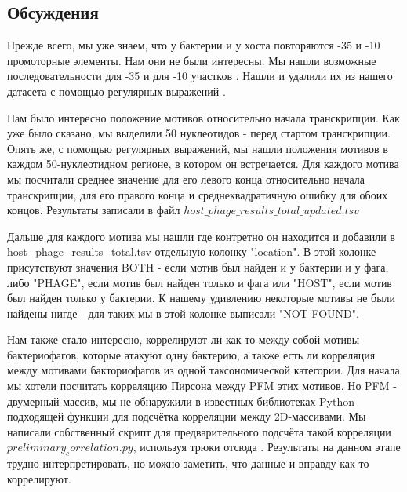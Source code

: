 \documentclass[a4paper,12pt]{article}
\begin{document}
\begin{center}
\item \subsection{Обсуждения}
\end{center}

    \par{Прежде всего, мы уже знаем, что у бактерии и у хоста повторяются -35 и -10 промоторные элементы. Нам они не
    были интересны. Мы нашли возможные последовательности для -35 и для -10 участков \cite{-35,-10,-35-10,-35-10wiki}.
    Нашли и удалили их из нашего датасета с помощью регулярных выражений \cite{re}. }
    
    \par{Нам было интересно положение мотивов относительно начала транскрипции. Как уже было сказано, мы выделили 50 
    нуклеотидов - перед стартом транскрипции. Опять же, с помощью регулярных выражений, мы нашли положения мотивов в
    каждом 50-нуклеотидном регионе, в котором он встречается. Для каждого мотива мы посчитали среднее значение для его
    левого конца относительно начала транскрипции, для его правого конца и среднеквадратичную ошибку для обоих
    концов. Результаты записали в файл $ host\_phage\_results\_total\_updated.tsv $}
    
    \par{Дальше для каждого мотива мы нашли где контретно он находится и добавили в host\_phage\_results\_total.tsv
    отдельную колонку "location". В этой колонке присутствуют значения BOTH - если мотив был найден и у бактерии и у
    фага, либо "PHAGE", если мотив был найден только и фага или "HOST", если мотив был найден только у бактерии. К
    нашему удивлению некоторые мотивы не были найдены нигде - для таких мы в этой колонке выписали "NOT FOUND".}
    
    \par{Нам также стало интересно, коррелируют ли как-то между собой мотивы бактериофагов, которые атакуют одну бактерию, а также есть ли корреляция между мотивами бакториофагов из одной таксономической категории. Для начала мы хотели посчитать корреляцию Пирсона между PFM этих мотивов. Но PFM - двумерный массив, мы не обнаружили в известных библиотеках Python подходящей функции для подсчётка корреляции между 2D-массивами. Мы написали собственный скрипт для предварительного подсчёта такой корреляции $preliminary_correlation.py$, используя трюки отсюда \cite{stackoverflow}. Результаты на данном этапе трудно интерпретировать, но можно заметить, что данные и вправду как-то коррелируют.}
    
\end{document}
